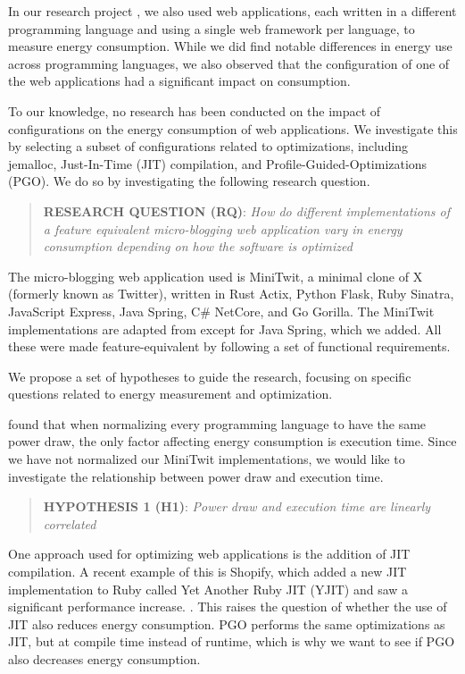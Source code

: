 \documentclass[../main.tex]{subfiles}
\begin{document}
In our research project \cite{Pfeiffer_Offenberg_Pedersen_Landsgaard_Karlsen}, we also used web applications, each written in a different programming language and using a single web framework per language, to measure energy consumption. While we did find notable differences in energy use across programming languages, we also observed that the configuration of one of the web applications had a significant impact on consumption. 

To our knowledge, no research has been conducted on the impact of configurations on the energy consumption of web applications. We investigate this by selecting a subset of configurations related to optimizations, including jemalloc, Just-In-Time (JIT) compilation, and Profile-Guided-Optimizations (PGO). We do so by investigating the following research question.

\begin{quote}
    \textbf{RESEARCH QUESTION (RQ)}: \emph{How do different implementations of a feature equivalent micro-blogging web application vary in energy consumption depending on how the software is optimized}
\end{quote}

The micro-blogging web application used is MiniTwit, a minimal clone of X (formerly known as Twitter\cite{verge-twitter-rebrand-x}), written in Rust Actix, Python Flask, Ruby Sinatra, JavaScript Express, Java Spring, C\# NetCore, and Go Gorilla. The MiniTwit implementations are adapted from \textcite{Pfeiffer_Trindade_Meding_Harwick} except for Java Spring, which we added. All these were made feature-equivalent by following a set of functional requirements.

We propose a set of hypotheses to guide the research, focusing on specific questions related to energy measurement and optimization.

\textcite{Kempen_Kwon_Nguyen_Berger_2024} found that when normalizing every programming language to have the same power draw, the only factor affecting energy consumption is execution time. Since we have not normalized our MiniTwit implementations, we would like to investigate the relationship between power draw and execution time.

\begin{quote}
    \textbf{HYPOTHESIS 1 (H1)}: \emph{Power draw and execution time are linearly correlated}
\end{quote}

One approach used for optimizing web applications is the addition of JIT compilation. A recent example of this is Shopify, which added a new JIT implementation to Ruby called Yet Another Ruby JIT (YJIT) and saw a significant performance increase. \cite{shopify-yjit}. This raises the question of whether the use of JIT also reduces energy consumption. PGO performs the same optimizations as JIT, but at compile time instead of runtime, which is why we want to see if PGO also decreases energy consumption.
\end{document}
